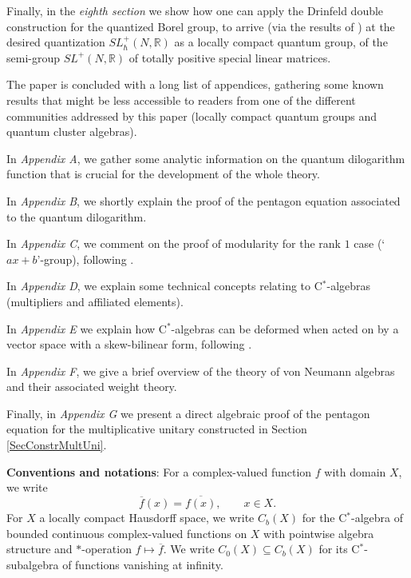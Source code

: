 \documentclass[11pt, reqno]{amsart}
\theoremstyle{definition}
\numberwithin{equation}{section}
\def\R{\mathbb R}
\begin{document}
Finally, in the \emph{eighth section} we show how one can apply the Drinfeld double construction for the quantized Borel group, to arrive (via the results of \cite{BV05}) at the desired quantization $ SL^+_
\hbar(N, \R) $ as a locally compact quantum group, of the semi-group $SL^+(N,\R)$ of totally positive special linear matrices. 

The paper is concluded with a long list of appendices, gathering some known results that might be less accessible to readers from one of the different communities addressed by this paper (locally compact quantum groups and quantum cluster algebras). 

In \emph{Appendix A}, we gather some analytic information on the quantum dilogarithm function that is crucial for the development of the whole theory.

In \emph{Appendix B}, we shortly explain the proof of the pentagon equation associated to the quantum dilogarithm. 

In \emph{Appendix C}, we comment on the proof of modularity for the rank $1$ case (`$ax+b$'-group), following \cite{WZ02}. 

In \emph{Appendix D}, we explain some technical concepts relating to C$^*$-algebras (multipliers and affiliated elements).

In \emph{Appendix E} we explain how C$^*$-algebras can be deformed when acted on by a vector space with a skew-bilinear form, following \cite{Rie93}. 

In \emph{Appendix F}, we give a brief overview of the theory of von Neumann algebras and their associated weight theory. 

Finally, in \emph{Appendix G} we present a direct algebraic proof of the pentagon equation for the multiplicative unitary constructed in Section \ref{SecConstrMultUni}.











\textbf{Conventions and notations}: 
For a complex-valued function $f$ with domain $X$, we write
\[
\overline{f}(x) = \overline{f(x)},\qquad x\in X. 
\]
For $X$ a locally compact Hausdorff space, we write $C_b(X)$ for the C$^*$-algebra of bounded continuous complex-valued functions on $X$ with pointwise algebra structure and $*$-operation $f \mapsto \overline{f}$. We write $C_0(X) \subseteq C_b(X)$ for its C$^*$-subalgebra of functions vanishing at infinity.
\end{document}
